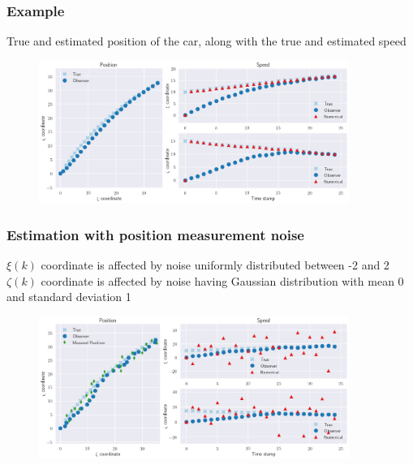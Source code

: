 \begin{frame}
    \frametitle{Example}
    True and estimated position of the car, along with the true and estimated speed
    \begin{figure}
    	\includegraphics[width=0.9\textwidth]{fig/observer_ex_1}
    \end{figure}
\end{frame}

\begin{frame}
	\frametitle{Estimation with position measurement noise}
	$\xi(k)$ coordinate is affected by noise uniformly distributed between -2 and 2\\
	$\zeta(k)$ coordinate is affected by noise having Gaussian distribution with mean 0 and standard deviation 1
	\begin{figure}
		\includegraphics[width=0.9\textwidth]{fig/observer_ex_2}
	\end{figure}
\end{frame}

